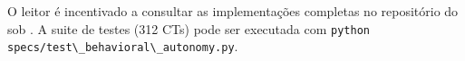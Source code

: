 \begin{observacao}
O leitor é incentivado a consultar as implementações completas no
repositório do \opencodeeco{} sob
. A suite de testes
(312 CTs) pode ser executada com \lstinline{python
specs/test\_behavioral\_autonomy.py}.
\end{observacao}

